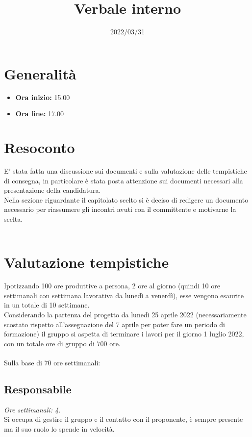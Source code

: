 \documentclass{classes/base}
\title{Verbale interno}
\date{2022/03/31}
\author{\marcob}
\renewcommand{\maketitle}{
    
}
\begin{document}
    \maketitle

    \section*{Generalità}
    \begin{itemize}
        \item \textbf{Ora inizio:} 15.00
        \item \textbf{Ora fine:} 17.00
    \end{itemize}
    
    \section*{Resoconto}
    E' stata fatta una discussione sui documenti e sulla valutazione delle tempistiche di consegna, in particolare è stata posta attenzione sui documenti necessari alla presentazione della candidatura.\\
    Nella sezione riguardante il capitolato scelto si è deciso di redigere un documento necessario per riassumere gli incontri avuti con il committente e motivarne la scelta.\\\\

    \section*{Valutazione tempistiche}
    Ipotizzando 100 ore produttive a persona, 2 ore al giorno (quindi 10 ore settimanali con settimana lavorativa da lunedì a venerdì), esse vengono esaurite in un totale di 10 settimane.\\
    Considerando la partenza del progetto da lunedì 25 aprile 2022 (necessariamente scostato rispetto all'assegnazione del 7 aprile per poter fare un periodo di formazione) il gruppo si aspetta di terminare i lavori per il giorno 1 luglio 2022, con un totale ore di gruppo di 700 ore.\\\\
    Sulla base di 70 ore settimanali:
    \subsection*{Responsabile}
    \textit{Ore settimanali: 4}.\\
    Si occupa di gestire il gruppo e il contatto con il proponente, è sempre presente ma il suo ruolo lo spende in velocità.
\end{document}
